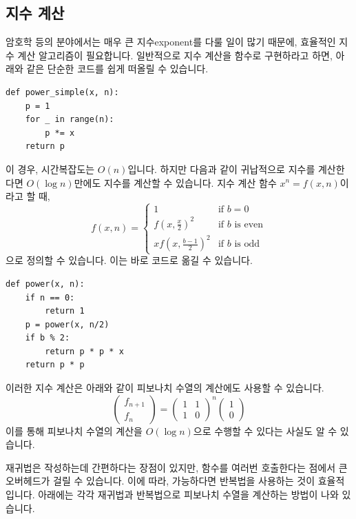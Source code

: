 \documentclass[../main.tex]{subfiles}
\begin{document}
\subsection{지수 계산}
암호학 등의 분야에서는 매우 큰 지수exponent를 다룰 일이 많기 때문에, 효율적인 지수 계산 알고리즘이 필요합니다.
일반적으로 지수 계산을 함수로 구현하라고 하면, 아래와 같은 단순한 코드를 쉽게 떠올릴 수 있습니다.
\begin{verbatim}
def power_simple(x, n):
    p = 1
    for _ in range(n):
        p *= x
    return p
\end{verbatim}
이 경우, 시간복잡도는 $O(n)$입니다.
하지만 다음과 같이 귀납적으로 지수를 계산한다면 $O(\log n)$만에도 지수를 계산할 수 있습니다.
지수 계산 함수 $x^n = f(x, n)$이라고 할 때,
\[
f(x, n) = \begin{cases}
1 & \text{if } b = 0\\
f\left(x, \frac x2 \right)^2 & \text{if } b \text{ is even}\\
x f\left(x, \frac{b - 1}{2}\right)^2 & \text{if } b \text{ is odd}
\end{cases}
\]
으로 정의할 수 있습니다.
이는 바로 코드로 옮길 수 있습니다.
\begin{verbatim}
def power(x, n):
    if n == 0:
        return 1
    p = power(x, n/2)
    if b % 2:
        return p * p * x
    return p * p
\end{verbatim}
이러한 지수 계산은 아래와 같이 피보나치 수열의 계산에도 사용할 수 있습니다.
\[
\begin{pmatrix}f_{n + 1} \\ f_n \end{pmatrix} = \begin{pmatrix}1 & 1 \\ 1 & 0 \end{pmatrix}^n \begin{pmatrix} 1 \\ 0 \end{pmatrix}
\]
이를 통해 피보나치 수열의 계산을 $O(\log n)$으로 수행할 수 있다는 사실도 알 수 있습니다.

재귀법은 작성하는데 간편하다는 장점이 있지만, 함수를 여러번 호출한다는 점에서 큰 오버헤드가 걸릴 수 있습니다.
이에 따라, 가능하다면 반복법을 사용하는 것이 효율적입니다.
아래에는 각각 재귀법과 반복법으로 피보나치 수열을 계산하는 방법이 나와 있습니다.
\end{document}

